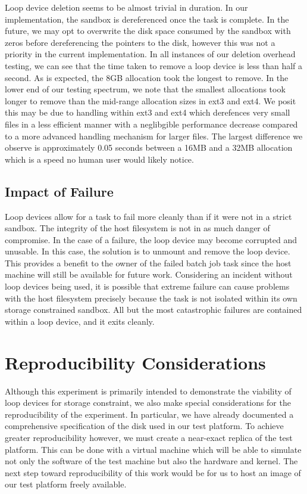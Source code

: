 \documentclass[conference]{IEEEtran}
\begin{document}
Loop device deletion seems to be almost trivial in duration. In our implementation, the sandbox is dereferenced once the task is complete. In the future, we may opt to overwrite the disk space consumed by the sandbox with zeros before dereferencing the pointers to the disk, however this was not a priority in the current implementation. In all instances of our deletion overhead testing, we can see that the time taken to remove a loop device is less than half a second. As is expected, the 8GB allocation took the longest to remove. In the lower end of our testing spectrum, we note that the smallest allocations took longer to remove than the mid-range allocation sizes in ext3 and ext4. We posit this may be due to handling within ext3 and ext4 which derefences very small files in a less efficient manner with a neglibgible performance decrease compared to a more advanced handling mechanism for larger files. The largest difference we observe is approximately 0.05 seconds between a 16MB and a 32MB allocation which is a speed no human user would likely notice.

\subsection{Impact of Failure}
Loop devices allow for a task to fail more cleanly than if it were not in a strict sandbox. The integrity of the host filesystem is not in as much danger of compromise. In the case of a failure, the loop device may become corrupted and unusable. In this case, the solution is to unmount and remove the loop device. This provides a benefit to the owner of the failed batch job task since the host machine will still be available for future work. Considering an incident without loop devices being used, it is possible that extreme failure can cause problems with the host filesystem precisely because the task is not isolated within its own storage constrained sandbox. All but the most catastrophic failures are contained within a loop device, and it exits cleanly.

\section{Reproducibility Considerations}
Although this experiment is primarily intended to demonstrate the viability of loop devices for storage constraint, we also make special considerations for the reproducibility of the experiment. In particular, we have already documented a comprehensive specification of the disk used in our test platform. To achieve greater reproducibility however, we must create a near-exact replica of the test platform. This can be done with a virtual machine which will be able to simulate not only the software of the test machine but also the hardware and kernel. The next step toward reproducibility of this work would be for us to host an image of our test platform freely available.
\end{document}
